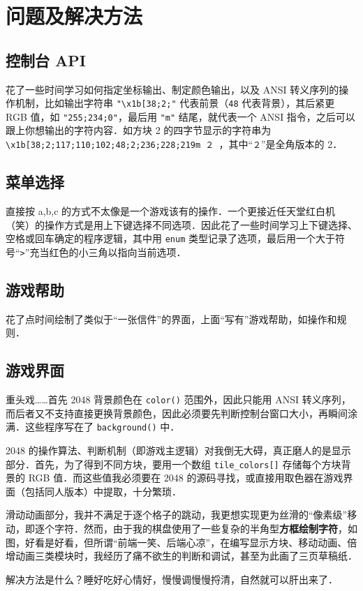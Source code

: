 \documentclass[12pt,a4paper,twoside]{ctexart}
\numberwithin{figure}{section}
\numberwithin{equation}{section}
\begin{document}
\newpage
\section{问题及解决方法}
\subsection{控制台 API}
花了一些时间学习如何指定坐标输出、制定颜色输出，以及 ANSI 转义序列的操作机制，比如输出字符串 \verb|"\x1b[38;2;"| 代表前景（\verb|48| 代表背景），其后紧更 RGB 值，如 \verb|"255;234;0"|，最后用 \verb|"m"| 结尾，就代表一个 ANSI 指令，之后可以跟上你想输出的字符内容．如方块 2 的四字节显示的字符串为 \verb|\x1b[38;2;117;110;102;48;2;236;228;219m ２ |，其中“\verb|２|”是全角版本的 2．

\subsection{菜单选择}
直接按 a,b,c 的方式不太像是一个游戏该有的操作．一个更接近任天堂红白机（笑）的操作方式是用上下键选择不同选项．因此花了一些时间学习上下键选择、空格或回车确定的程序逻辑，其中用 \verb|enum| 类型记录了选项，最后用一个大于符号“\verb|>|”充当红色的小三角以指向当前选项．
\subsection{游戏帮助}
花了点时间绘制了类似于“一张信件”的界面，上面“写有”游戏帮助，如操作和规则．
\subsection{游戏界面}
重头戏……首先 2048 背景颜色在 \verb|color()| 范围外，因此只能用 ANSI 转义序列，而后者又不支持直接更换背景颜色，因此必须要先判断控制台窗口大小，再瞬间涂满．这些程序写在了 \verb|background()| 中．

2048 的操作算法、判断机制（即游戏主逻辑）对我倒无大碍，真正磨人的是显示部分．首先，为了得到不同方块，要用一个数组 \verb|tile_colors[]| 存储每个方块背景的 RGB 值．而这些值我必须要在 2048 的源码寻找，或直接用取色器在游戏界面（包括同人版本）中提取，十分繁琐．

滑动动画部分，我并不满足于逐个格子的跳动，我更想实现更为丝滑的“像素级”移动，即逐个字符．然而，由于我的棋盘使用了一些复杂的半角型\textbf{方框绘制字符}，如图，好看是好看，但所谓“前端一笑、后端心凉”，在编写显示方块、移动动画、倍增动画三类模块时，我经历了痛不欲生的判断和调试，甚至为此画了三页草稿纸．

解决方法是什么？睡好吃好心情好，慢慢调慢慢捋清，自然就可以肝出来了．
\end{document}
